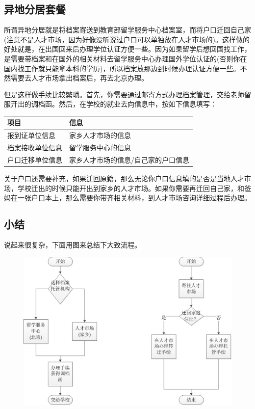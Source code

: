 \subsection{异地分居套餐}
所谓异地分居就是将档案寄送到教育部留学服务中心档案室，而将户口迁回自己家(注意不是人才市场，因为好像没听说过户口可以单独放在人才市场的)。这样做的好处就是，在出国回来后办理学位认证方便一些。因为如果留学后想回国找工作，是需要带档案和在国外的相关材料去留学服务中心办理国外学位认证的(否则你在国内找工作就只能拿本科的学历)，所以档案放那边到时候办理认证方便一些。不然需要去人才市场拿出档案后，再去北京办理。\par
但是这样做手续比较繁琐。首先，你需要通过邮寄方式办理\href{https://www.evernote.com/shard/s51/sh/14ca023f-da28-4bb7-9c27-8f7f8da89fdd/6dc819d3c82f8f739dd2d88884105338}{档案管理}，交给老师留服开出的调档函。然后，在学校的就业去向信息中，按如下信息填写：
\begin{center}
\begin{tabular}{|l|l|}
\hline
项目 & 信息 \\ \hline
报到证单位信息 & 家乡人才市场的信息 \\
档案接收单位信息 & 留学服务中心的信息\\
户口迁移单位信息 & 家乡人才市场的信息/自己家的户口信息\\ \hline
\end{tabular}
\end{center}\par
关于户口还需要补充，如果迁回原籍，那么无论你户口信息填的是否是当地人才市场，学校迁出的时候只能开出到家乡的人才市场。如果你需要再迁回自己家，和爸妈在一张户口本上，那么需要你带齐相关材料，到人才市场咨询详细过程后办理。

\subsection{小结}
说起来很复杂，下面用图来总结下大致流程。\\
\begin{figure}[htbp]
\centering
\includegraphics[width=12cm]{4postoffer/hukou.eps}
\end{figure}\par
